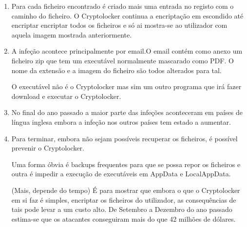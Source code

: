\documentclass[a4paper,10pt]{report}
\begin{document}
\begin{enumerate}
	\item Para cada ficheiro encontrado é criado mais uma entrada no registo com o caminho do ficheiro.
	O Cryptolocker continua a encriptação em escondido até encriptar encriptar todos os ficheiros 
e só ai mostra-se ao utilizador com aquela imagem mostrada anteriormente.

	\item A infeção acontece principalmente por email.O email contém como anexo um ficheiro zip que tem
um executável normalmente mascarado como PDF. O nome da extensão e a imagem do ficheiro são todos alterados para tal. 

O executável não é o Cryptolocker mas sim um outro programa que irá fazer download e executar o
Cryptolocker.

	\item No final do ano passado a maior parte das infeções aconteceram em países de língua inglesa embora a infeção nos outros países tem estado a aumentar.

	\item Para terminar, embora não sejam possíveis recuperar os ficheiros, é possível prevenir o Cryptolocker.
	
	Uma forma óbvia é backups frequentes para que se possa repor os ficheiros e outra
é impedir a execução de executáveis em AppData e LocalAppData.

(Mais, depende do tempo)
	É para mostrar que embora o que o Cryptolocker em si faz é simples, encriptar os ficheiros do
utilizador, as consequências de tais pode levar a um custo alto.
	De Setembro a Dezembro do ano passado estima-se que os atacantes conseguiram mais do que 42 milhões de 
dólares.
\end{enumerate}
\end{document}
